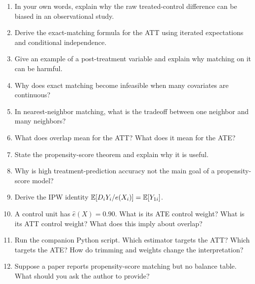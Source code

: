 \begin{enumerate}
    \item In your own words, explain why the raw treated-control difference can
    be biased in an observational study.
    \item Derive the exact-matching formula for the ATT using iterated
    expectations and conditional independence.
    \item Give an example of a post-treatment variable and explain why matching
    on it can be harmful.
    \item Why does exact matching become infeasible when many covariates are
    continuous?
    \item In nearest-neighbor matching, what is the tradeoff between one
    neighbor and many neighbors?
    \item What does overlap mean for the ATT? What does it mean for the ATE?
    \item State the propensity-score theorem and explain why it is useful.
    \item Why is high treatment-prediction accuracy not the main goal of a
    propensity-score model?
    \item Derive the IPW identity
    \(\mathbb{E}[D_iY_i/e(X_i)]=\mathbb{E}[Y_{1i}]\).
    \item A control unit has \(\widehat e(X)=0.90\). What is its ATE control
    weight? What is its ATT control weight? What does this imply about
    overlap?
    \item Run the companion Python script. Which estimator targets the ATT?
    Which targets the ATE? How do trimming and weights change the interpretation?
    \item Suppose a paper reports propensity-score matching but no balance table.
    What should you ask the author to provide?
\end{enumerate}


